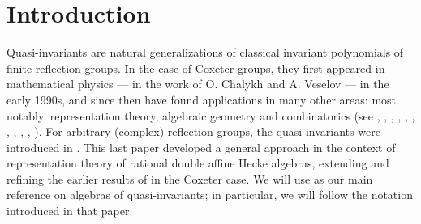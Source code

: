 \documentclass[11pt]{amsart}
\theoremstyle{definition}
\theoremstyle{remark}
\numberwithin{equation}{section}
\newcommand{\la}{\label}
\begin{document}
\section{Introduction}
\la{S1}
Quasi-invariants are natural generalizations of classical invariant polynomials of finite reflection groups. In the case of Coxeter groups, they first appeared in mathematical physics --- in the work of O. Chalykh and A. Veselov \cite{CV90, CV93} --- in the early 1990s, and since then have found applications in many other areas:  most notably,  representation theory, algebraic geometry and combinatorics (see \cite{FV02}, \cite{EG02b}, \cite{Ch02}, \cite{BEG03}, \cite{FeV03}, \cite{GW06}, \cite{BM08}, \cite{T10}, \cite{BC11}, \cite{BEF20}, \cite{Gri21}). For arbitrary (complex) reflection groups, the quasi-invariants were introduced in \cite{BC11}. This last paper developed a general approach in the context of representation theory of rational double affine Hecke algebras, extending and refining the earlier results of \cite{BEG03} in the Coxeter case. We will use \cite{BC11} as our main reference on algebras of quasi-invariants; in particular, we will follow the notation introduced in that paper.
\end{document}

